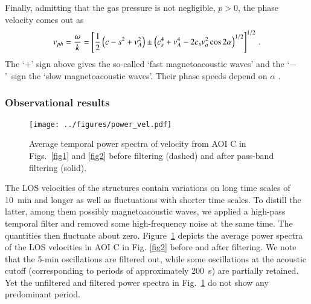 Finally, admitting that the gas pressure is not negligible, $p>0$, the phase velocity comes out as 
\begin{equation}
v_{ph}={\omega\over k}=\left[{1\over2}\left(c-s^2+v_A^2\right)\pm\left(c_s^4+v_A^4-2c_sv_a^2\cos2\alpha\right)^{1/2}\right]^{1/2}\,.
\label{mhd27}
\end{equation}
The `+' sign above gives the so-called `fast magnetoacoustic waves' and the `$-$'~sign the `slow magnetoacoustic waves'. Their phase speeds depend on $\alpha$ \citep[see the hodographs in][]{ferraro66,kippenhahn75,priest84}. 


\newpage
\subsubsection*{Observational results\label{obswaves}}
\begin{figure}[t]%
\center 
\texttt{[image: ../figures/power\_vel.pdf]} 
\caption{Average temporal power spectra of velocity from AOI C in Figs.~\ref{fig1} and \ref{fig2} before filtering (dashed) and after pass-band filtering (solid).}  
\label{fig6}
\end{figure}

The LOS velocities of the structures contain variations on long time scales of 10~min and longer as well as fluctuations with shorter time scales. To {distill} the latter, among them possibly magnetoacoustic waves, we applied a high-pass temporal filter and removed some high-frequency noise at the same time. The quantities then fluctuate about zero. Figure~\ref{fig6} depicts the average power spectra of the LOS velocities in AOI C in Fig. \ref{fig2} before and after filtering. We note that the 5-min oscillations are filtered out, while some oscillations at the acoustic cutoff (corresponding to periods of approximately 200~s) are partially retained. Yet the unfiltered and filtered power spectra in Fig.~\ref{fig6} do not show any predominant period.



